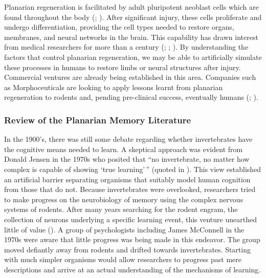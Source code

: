 \documentclass[
  jou,
  floatsintext,
  longtable,
  nolmodern,
  notxfonts,
  notimes,
  donotrepeattitle,
  colorlinks=true,linkcolor=blue,citecolor=blue,urlcolor=blue]{apa7}
\begin{document}
Planarian regeneration is facilitated by adult pluripotent neoblast
cells which are found throughout the body
(;
).
After significant injury, these cells proliferate and undergo
differentiation, providing the cell types needed to restore organs,
membranes, and neural networks in the brain. This capability has drawn
interest from medical researchers for more than a century
(;
;
). By understanding
the factors that control planarian regeneration, we may be able to
artificially simulate these processes in humans to restore limbs or
neural structures after injury. Commercial ventures are already being
established in this area. Companies such as Morphoceuticals are looking
to apply lessons learnt from planarian regeneration to rodents and,
pending pre-clinical success, eventually humans
(; ).

\subsubsection{Review of the Planarian Memory
Literature}\label{sec-review-of-planarian-memory-literature}

In the 1900's, there was still some debate regarding whether
invertebrates have the cognitive means needed to learn. A skeptical
approach was evident from Donald Jensen in the 1970s who posited that
``no invertebrate, no matter how complex is capable of showing `true
learning'\,'' (quoted in ). This view established an artificial barrier separating
organisms that suitably model human cognition from those that do not.
Because invertebrates were overlooked, researchers tried to make
progress on the neurobiology of memory using the complex nervous systems
of rodents. After many years searching for the rodent engram, the
collection of neurons underlying a specific learning event, this venture
unearthed little of value
(). A
group of psychologists including James McConnell in the 1970s were aware
that little progress was being made in this endeavor. The group moved
defiantly away from rodents and drifted towards invertebrates. Starting
with much simpler organisms would allow researchers to progress past
mere descriptions and arrive at an actual understanding of the
mechanisms of learning.
\end{document}
